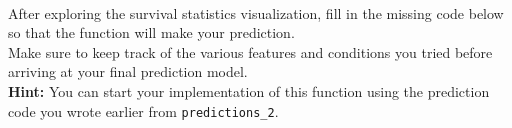 \documentclass[11pt]{article}
\begin{document}
    \begin{center}
    \end{center}
    { \hspace*{\fill} \\}
    
    After exploring the survival statistics visualization, fill in the
missing code below so that the function will make your prediction.\\
Make sure to keep track of the various features and conditions you tried
before arriving at your final prediction model.\\
\textbf{Hint:} You can start your implementation of this function using
the prediction code you wrote earlier from \texttt{predictions\_2}.
\end{document}
